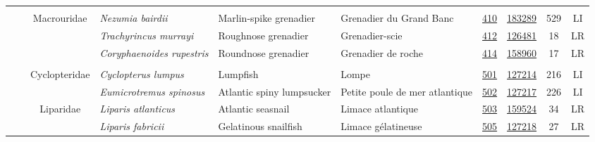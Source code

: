 \documentclass[12pt]{article}\usepackage[]{graphicx}\usepackage[]{color}
\begin{document}
\begin{landscape}
\begin{longtable}[t]{ccc>{\centering\arraybackslash}p{3cm}>{\centering\arraybackslash}p{3cm}>{\centering\arraybackslash}p{3cm}>{}c>{}ccc}
\nopagebreak
\addlinespace[0.3em]
\\
\hspace{1em}\hspace{1em} &  & Macrouridae & \em{Nezumia bairdii} & Marlin-spike grenadier & Grenadier du Grand Banc & \href{#sec:410}{410} & \href{http://www.marinespecies.org/aphia.php?p=taxdetails&id=183289}{183289} & 529 & LI\\
\nopagebreak
\hspace{1em}\hspace{1em} &  &  & \em{Trachyrincus murrayi} & Roughnose grenadier & Grenadier-scie & \href{#sec:412}{412} & \href{http://www.marinespecies.org/aphia.php?p=taxdetails&id=126481}{126481} & 18 & LR\\
\nopagebreak
\hspace{1em}\hspace{1em} &  &  & \em{Coryphaenoides rupestris} & Roundnose grenadier & Grenadier de roche & \href{#sec:414}{414} & \href{http://www.marinespecies.org/aphia.php?p=taxdetails&id=158960}{158960} & 17 & LR\\
\nopagebreak
\addlinespace[0.3em]
\\
\hspace{1em}\hspace{1em} &  & Cyclopteridae & \em{Cyclopterus lumpus} & Lumpfish & Lompe & \href{#sec:501}{501} & \href{http://www.marinespecies.org/aphia.php?p=taxdetails&id=127214}{127214} & 216 & LI\\
\nopagebreak
\hspace{1em}\hspace{1em} &  &  & \em{Eumicrotremus spinosus} & Atlantic spiny lumpsucker & Petite poule de mer atlantique & \href{#sec:502}{502} & \href{http://www.marinespecies.org/aphia.php?p=taxdetails&id=127217}{127217} & 226 & LI\\
\nopagebreak
\hspace{1em}\hspace{1em} &  & Liparidae & \em{Liparis atlanticus} & Atlantic seasnail & Limace atlantique & \href{#sec:503}{503} & \href{http://www.marinespecies.org/aphia.php?p=taxdetails&id=159524}{159524} & 34 & LR\\
\nopagebreak
\hspace{1em}\hspace{1em} &  &  & \em{Liparis fabricii} & Gelatinous snailfish & Limace gélatineuse & \href{#sec:505}{505} & \href{http://www.marinespecies.org/aphia.php?p=taxdetails&id=127218}{127218} & 27 & LR\\

\end{longtable}
\end{landscape}
\end{document}
